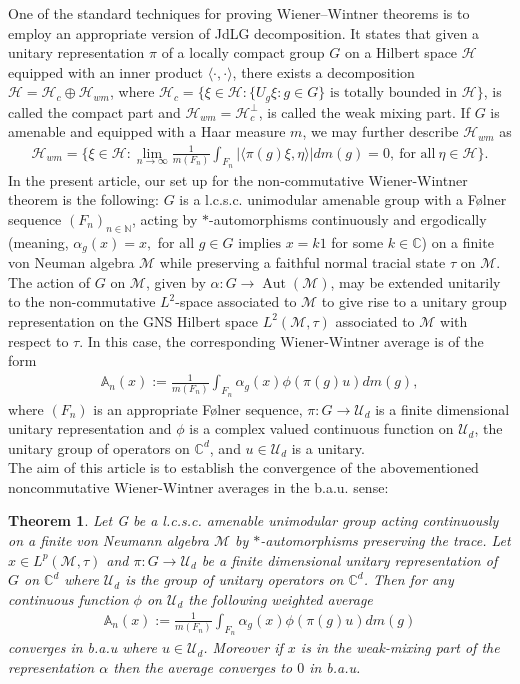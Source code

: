\documentclass[11pt]{amsart}
\newtheorem{thm}{Theorem}[section]
\theoremstyle{definition}
\theoremstyle{myremark}
\numberwithin{equation}{section}
\def\C{\mathbb C}
\newcommand{\CH}{\mathcal{H}}
\newcommand{\CM}{\mathcal{M}}
\newcommand{\CU}{\mathcal{U}}
\newcommand{\Aut}{\operatorname{Aut}}
\begin{document}
One of the standard techniques for proving Wiener–Wintner theorems is to employ an appropriate version of JdLG decomposition.
 It states that given a unitary representation $\pi$ of a locally compact group $G$ on a Hilbert space $\CH$ equipped with an inner product $\langle \cdot,\cdot\rangle$, there exists a decomposition $\CH=\CH_{c}\oplus \CH_{wm}$, where $\CH_{c}=\{\xi \in \CH:\{U_{g}{\xi}:g \in G\} \text{ is totally bounded in } \CH\}$, is called the compact part and $\CH_{wm}=\CH^{\perp}_{c}$, is called the weak mixing part. If $G$ is amenable and equipped with a Haar measure $m$, we may further describe $\CH_{wm}$ as 
\begin{align*}
\CH_{wm}=\{\xi \in \CH:\lim_{n \to \infty}\frac{1}{m(F_{n})}\int_{F_{n}}|\langle \pi(g)\xi,\eta\rangle|dm(g)=0, ~\text{for all}~ \eta \in \CH\}.
\end{align*} 
In the present article, our set up for the non-commutative Wiener-Wintner theorem is the following: $G$ is a l.c.s.c. unimodular amenable group with a F{\o}lner sequence $(F_{n})_{n \in \mathbb{N}}$, acting by $*$-automorphisms  continuously and ergodically (meaning, $\alpha_{g}(x)=x, $  for all $ g \in G \text{ implies }x=k 1$ for some $k \in \mathbb{C}$) on a finite von Neuman algebra $\CM$ while preserving a faithful normal tracial state $\tau$ on $\CM$. The action of $G$ on $\CM$, given by $\alpha:G \rightarrow \Aut(\CM)$, may be extended unitarily to the non-commutative $L^2$-space associated to $\CM$ to give rise to a unitary group representation on the GNS Hilbert space $L^{2}(\CM,\tau)$ associated to $\CM$ with respect to $ \tau$. In this case, the corresponding Wiener-Wintner average is of the form
\begin{align*}
    \mathbb{A}_n(x):= \frac{1}{m(F_n)}\int_{F_n}\alpha_g(x)\phi(\pi(g) u)dm(g),
\end{align*}
where $(F_n)$ is an appropriate F\o lner sequence, $\pi:G \to \mathcal{U}_d$ is a finite dimensional unitary representation and $\phi$ is a complex valued continuous function on $\mathcal{U}_d$, the unitary group of operators on $\C^{d}$, and $u \in \CU_{d}$ is a unitary.\\
The aim of this article is to establish the convergence of the abovementioned noncommutative Wiener-Wintner averages in the b.a.u. sense:
\begin{thm}\label{main}
    Let G be a l.c.s.c. amenable unimodular group acting continuously on a finite von Neumann algebra $\CM$ by $*$-automorphisms preserving the trace.  Let $x\in L^p(\CM,\tau)$ and $\pi: G \to \mathcal{U}_d$ be a finite dimensional unitary representation of $G$ on $\mathbb{C}^d$ where $\mathcal{U}_d$ is the group of unitary operators on $\mathbb{C}^d$. Then for any continuous function $\phi$ on $\mathcal{U}_d$ the following weighted average 
    \begin{align}\label{Avg_2}
        \mathbb{A}_n(x):= \frac{1}{m(F_n)}\int_{F_n}\alpha_g(x)\phi(\pi(g) u)dm(g)
    \end{align}
    converges in b.a.u where $u \in \mathcal{U}_d$. Moreover if $x$ is in the weak-mixing part of the representation $\alpha$ then the average converges to $0$ in b.a.u. 
\end{thm}
\end{document}
